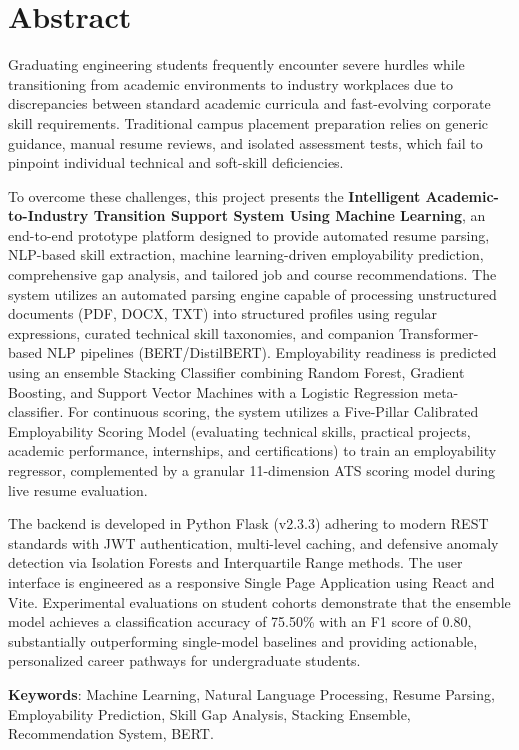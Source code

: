 \documentclass[12pt,a4paper]{report}
\begin{document}

\pagestyle{plain}
\chapter*{Abstract}
Graduating engineering students frequently encounter severe hurdles while transitioning from academic environments to industry workplaces due to discrepancies between standard academic curricula and fast-evolving corporate skill requirements. Traditional campus placement preparation relies on generic guidance, manual resume reviews, and isolated assessment tests, which fail to pinpoint individual technical and soft-skill deficiencies. 

To overcome these challenges, this project presents the \textbf{Intelligent Academic-to-Industry Transition Support System Using Machine Learning}, an end-to-end prototype platform designed to provide automated resume parsing, NLP-based skill extraction, machine learning-driven employability prediction, comprehensive gap analysis, and tailored job and course recommendations. The system utilizes an automated parsing engine capable of processing unstructured documents (PDF, DOCX, TXT) into structured profiles using regular expressions, curated technical skill taxonomies, and companion Transformer-based NLP pipelines (BERT/DistilBERT). Employability readiness is predicted using an ensemble Stacking Classifier combining Random Forest, Gradient Boosting, and Support Vector Machines with a Logistic Regression meta-classifier. For continuous scoring, the system utilizes a Five-Pillar Calibrated Employability Scoring Model (evaluating technical skills, practical projects, academic performance, internships, and certifications) to train an employability regressor, complemented by a granular 11-dimension ATS scoring model during live resume evaluation.

The backend is developed in Python Flask (v2.3.3) adhering to modern REST standards with JWT authentication, multi-level caching, and defensive anomaly detection via Isolation Forests and Interquartile Range methods. The user interface is engineered as a responsive Single Page Application using React and Vite. Experimental evaluations on student cohorts demonstrate that the ensemble model achieves a classification accuracy of 75.50\% with an F1 score of 0.80, substantially outperforming single-model baselines and providing actionable, personalized career pathways for undergraduate students.
\par
\vspace{0.15in}
\noindent \textbf{Keywords}: Machine Learning, Natural Language Processing, Resume Parsing, Employability Prediction, Skill Gap Analysis, Stacking Ensemble, Recommendation System, BERT.
\end{document}
